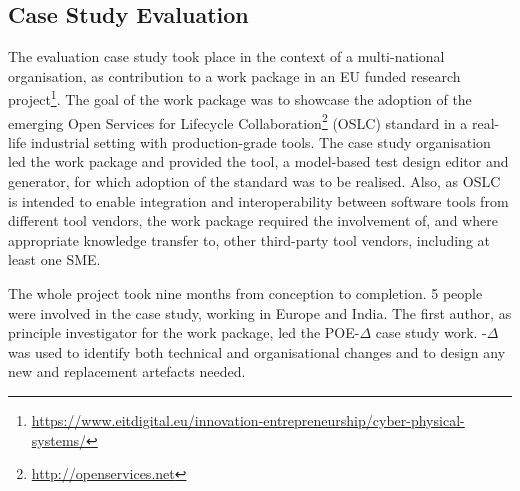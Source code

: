 \documentclass[runningheads,a4paper]{llncs}
\begin{document}
\subsection{Case Study Evaluation}
\label{caseStudy}
%
%

The evaluation case study took place in the context of a multi-national organisation, as contribution to a work package in an EU funded research project\footnote{\url{https://www.eitdigital.eu/innovation-entrepreneurship/cyber-physical-systems/}}. The goal of the work package was to showcase the adoption of the emerging Open Services for Lifecycle Collaboration\footnote{\url{http://openservices.net}} (OSLC) standard in a real-life industrial setting with production-grade tools. The case study organisation led the  work package and provided the tool, a model-based test design editor and generator, for which adoption of the standard was to be realised. Also, as OSLC is intended to enable integration and interoperability between software tools from different tool vendors, the work package required the involvement of, and where appropriate knowledge transfer to, other third-party tool vendors, including at least one SME. 

The whole project took nine months from conception to completion. 5 people were involved in the case study, working in Europe and India. The first author, as principle investigator for the work package, led the POE-$\Delta$ case study work. \POE{}-$\Delta$ was used to identify both technical and organisational changes and to design any new and replacement artefacts needed.
\end{document}
